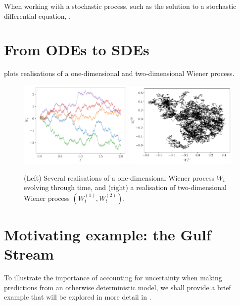 When working with a stochastic process, such as the solution to a stochastic differential equation, .

\section{From ODEs to SDEs}

 plots realisations of a one-dimensional and two-dimensional Wiener process.

\begin{figure}
	\begin{center}
		\includegraphics[width=0.49\textwidth]{figures/wiener_realisations_1d.pdf}
		\includegraphics[width=0.49\textwidth]{figures/wiener_realisations_2d.pdf}
		\caption{(Left) Several realisations of a one-dimensional Wiener process \(W_t\) evolving through time, and (right) a realisation of two-dimensional Wiener process \(\left(W_t^{(1)}, W_t^{(2)}\right)\).}
		\label{fig:wiener_rels}
	\end{center}
\end{figure}

\section{Motivating example: the Gulf Stream}

To illustrate the importance of accounting for uncertainty when making predictions from an otherwise deterministic model, we shall provide a brief example that will be explored in more detail in .

